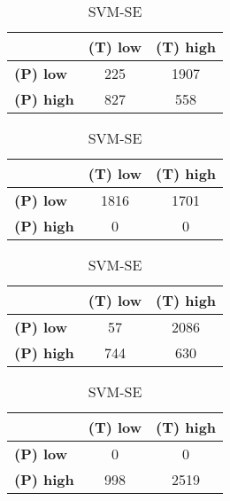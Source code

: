 \begin{landscape}
\begin{table}[htbp]
\centering
\caption{PCA_HoE__08 RF2}
\begin{minipage}{.3\textwidth}
\tiny
\caption*{SVM-AP}
\begin{tabular}{|l|c|c|}
\hline
					& \textbf{(T) low}	& \textbf{(T) high}	\\ \hline
\textbf{(P) low}	& 225				& 1907				\\ \hline
\textbf{(P) high}	& 827				& 558				\\ \hline
\end{tabular}
\end{minipage}\hfill
\begin{minipage}{.3\textwidth}
\tiny
\caption*{SVM-AT}
\begin{tabular}{|l|c|c|}
\hline
					& \textbf{(T) low}	& \textbf{(T) high}	\\ \hline
\textbf{(P) low}	& 1816				& 1701				\\ \hline
\textbf{(P) high}	& 0					& 0					\\ \hline
\end{tabular}
\end{minipage}\hfill
\begin{minipage}{.3\textwidth}
\tiny
\caption*{SVM-PL}
\begin{tabular}{|l|c|c|}
\hline
					& \textbf{(T) low}	& \textbf{(T) high}	\\ \hline
\textbf{(P) low}	& 57				& 2086				\\ \hline
\textbf{(P) high}	& 744				& 630				\\ \hline
\end{tabular}
\end{minipage}\hfill
\begin{minipage}{.3\textwidth}
\tiny
\caption*{SVM-SE}
\begin{tabular}{|l|c|c|}
\hline
					& \textbf{(T) low}	& \textbf{(T) high}	\\ \hline
\textbf{(P) low}	& 0					& 0					\\ \hline
\textbf{(P) high}	& 998				& 2519				\\ \hline
\end{tabular}
\end{minipage}\hfill
\end{table}
\begin{table}[htbp]
\centering
\begin{minipage}{.3\textwidth}
\tiny
\caption*{MLP-AP}

\end{minipage}
\end{table}
\end{landscape}
